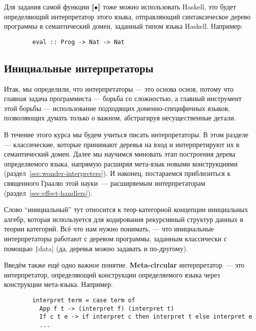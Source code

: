 \documentclass[12pt]{article}
\newcommand{\vocab}[1]{\textbf{#1}} %
\newcommand{\sembr}[1]{\llbracket{#1}\rrbracket} %
\begin{document}
    Для задания самой функции $\sembr{\bullet}$ тоже можно использовать Haskell, это будет определяющий интерпретатор этого языка, отправляющий синтаксическое дерево программы в семантический домен, заданный типом языка Haskell.
    Например:
    \begin{verbatim}
        eval :: Prog -> Nat -> Nat
    \end{verbatim}

    \subsection{Инициальные интерпретаторы}

    Итак, мы определили, что интерпретаторы --- это основа основ, потому что главная задача программиста --- борьба со сложностью, а главный инструмент этой борьбы --- использование подходящих доменно-специфичных языков, позволяющих думать только о важном, абстрагируя несущественные детали.

    В течение этого курса мы будем учиться писать интерпретаторы.
    В этом разделе --- классические, которые принимают деревья на вход и интерпретируют их в семантический домен.
    Далее мы научимся миновать этап построения дерева определяемого языка, напрямую расширяя мета-язык новыми конструкциями (раздел~\ref{sec:wonder-interpreters}).
    И наконец, постараемся приблизиться к священного Граалю этой науки~--- расширяемым интерпретаторам (раздел~\ref{sec:effect-handlers}).


    Слово ``инициальный'' тут относится к теор-категорной концепции инициальных алгебр, которая используется для кодирования рекурсивный структур данных в теории категорий.
    Всё что нам нужно понимать, --- что инициальные интерпретаторы работают с деревом программы, заданным классически с помощью \texttt|data| (да, деревья можно задавать и по-другому).


    Введём также ещё одно важное понятие.
    \vocab{Meta-circular} интерпретатор~--- это интерпретатор, определяющий конструкции определяемого языка через конструкции мета-языка.
    Например:
    \begin{verbatim}
        interpret term = case term of
          App f t -> (interpret f) (interpret t)
          If c t e -> if interpret c then interpret t else interpret e
          ...
    \end{verbatim}
\end{document}
